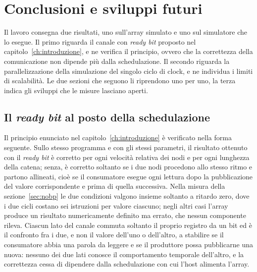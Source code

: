 \chapter{Conclusioni e sviluppi futuri}
\label{ch:conclusioni}

Il lavoro consegna due risultati, uno sull'array simulato e uno sul simulatore
che lo esegue. Il primo riguarda il canale con \emph{ready bit} proposto nel
capitolo~\ref{ch:introduzione}, e ne verifica il principio, ovvero che la correttezza
della comunicazione non dipende più dalla schedulazione. Il secondo riguarda la
parallelizzazione della simulazione del singolo ciclo di clock, e ne individua
i limiti di scalabilità. Le due sezioni che seguono li riprendono uno per uno,
la terza indica gli sviluppi che le misure lasciano aperti.


\section{Il \emph{ready bit} al posto della schedulazione}
\label{sec:sintesi-finale}

Il principio enunciato nel capitolo~\ref{ch:introduzione} è verificato nella
forma seguente. Sullo stesso programma e con gli stessi parametri, il risultato
ottenuto con il \emph{ready bit} è corretto per ogni velocità relativa dei nodi e
per ogni lunghezza della catena; senza, è corretto soltanto se i due nodi
procedono allo stesso ritmo e partono allineati, cioè se il consumatore esegue
ogni lettura dopo la pubblicazione del valore corrispondente e prima di quella
successiva. Nella misura della sezione~\ref{sec:nobp} le due condizioni valgono
insieme soltanto a ritardo zero, dove i due cicli costano sei istruzioni per
valore ciascuno; negli altri casi l'array produce un risultato numericamente
definito ma errato, che nessun componente rileva. Ciascun lato del
canale commuta soltanto il proprio registro da un bit ed è il confronto fra i
due, e non il valore dell'uno o dell'altro, a stabilire se il consumatore abbia una parola da leggere e se il produttore
possa pubblicarne una nuova: nessuno dei due lati conosce il comportamento temporale dell'altro, e la
correttezza cessa di dipendere dalla schedulazione con cui l'host alimenta
l'array.

